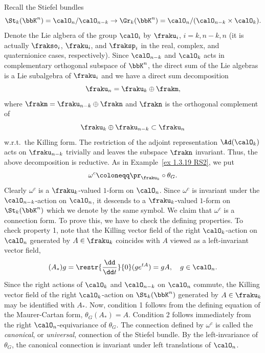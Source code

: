 \begin{example}
    Recall the Stiefel bundles
    \[\St_k(\bbK^n)=\calO_n\slash \calO_{n-k}\to \Gr_k(\bbK^n)=\calO_n\slash (\calO_{n-k}\times\calO_k).\]
    Denote the Lie algbera of the group $\calO_i$ by $\fraku_i$, $i=k,n-k,n$ (it is actually $\frakso_i$, $\fraku_i$, and $\fraksp_i$ in the real, complex, and quaternionice cases, respectively). Since $\calO_{n-k}$ and $\calO_k$ acts in complementary orthogonal subspace of $\bbK^n$, the direct sum of the Lie algebras is a Lie subalgebra of $\fraku_i$ and we have a direct sum decomposition
    \[\fraku_n=\fraku_k\oplus\frakm,\]
    where $\frakm=\fraku_{n-k}\oplus\frakn$ and $\frakn$ is the orthogonal complement of
    \[\fraku_k\oplus\fraku_{n-k}\subset \fraku_n\]
    w.r.t.\ the Killing form. The restriction of the adjoint representation $\Ad(\calO_k)$ acts on $\fraku_{n-k}$ trivially and leaves the subspace $\frakn$ invariant. Thus, the above decomposition is reductive. As in Example~\ref{ex 1.3.19 RS2}, we put
    \[\omega^c\coloneqq \pr_{\fraku_k}\circ\theta_G.\]
    Clearly $\omega^c$ is a $\fraku_k$-valued $1$-form on $\calO_n$. Since $\omega^c$ is invariant under the $\calO_{n-k}$-action on $\calO_n$, it descends to a $\fraku_k$-valued $1$-form on $\St_k(\bbK^n)$ which we denote by the same symbol. We claim that $\omega^c$ is a connection form. To prove this, we have to check the defining properties. To check property 1, note that the Killing vector field of the right $\calO_k$-action on $\calO_n$ generated by $A\in \fraku_k$ coincides with $A$ viewed as a left-invariant vector field,
    \[(A_\ast)g=\restr{\frac{\dd}{\dd t}}{0}(g e^{tA})=gA,\quad g\in\calO_n.\]
    Since the right actions of $\calO_k$ and $\calO_{n-k}$ on $\calO_n$ commute, the Killing vector field of the right $\calO_k$-action on $\St_k(\bbK^n)$ generated by $A\in\fraku_k$ may be identified with $A_\ast$. Now, condition 1 follows from the defining equation of the Maurer-Cartan form, $\theta_G(A_\ast)=A$. Condition 2 follows immediately from the right $\calO_n$-equivariance of $\theta_G$. The connection defined by $\omega^c$ is called the \emph{canonical}, or \emph{universal}, connection of the Stiefel bundle. By the left-invariance of $\theta_G$, the canonical connection is invariant under left translations of $\calO_n$.


\end{example}
